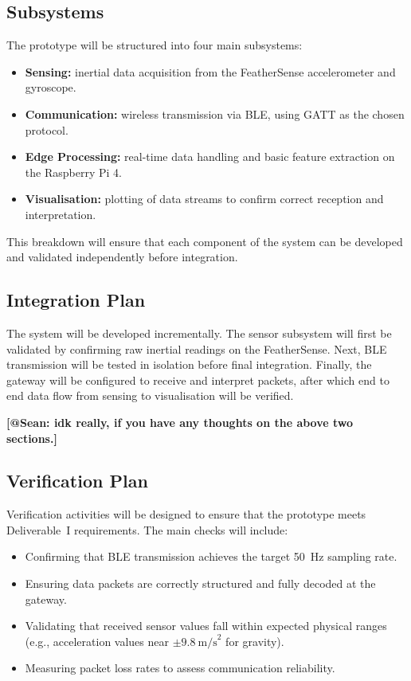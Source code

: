 \documentclass[conference]{lib/IEEEtran}
\begin{document}
\subsection{Subsystems}
The prototype will be structured into four main subsystems: 
\begin{itemize}
	\item \textbf{Sensing:} inertial data acquisition from the FeatherSense accelerometer and gyroscope. 
	\item \textbf{Communication:} wireless transmission via BLE, using GATT as the chosen protocol. 
	\item \textbf{Edge Processing:} real-time data handling and basic feature extraction on the Raspberry Pi 4. 
	\item \textbf{Visualisation:} plotting of data streams to confirm correct reception and interpretation. 
\end{itemize}
This breakdown will ensure that each component of the system can be developed and validated independently before integration. 

\subsection{Integration Plan}
The system will be developed incrementally. The sensor subsystem will first be validated by confirming raw inertial readings on the FeatherSense. Next, BLE transmission will be tested in isolation before final integration. Finally, the gateway will be configured to receive and interpret packets, after which end to end data flow from sensing to visualisation will be verified. 


\textbf{[@Sean: idk really, if you have any thoughts on the above two sections.]}

\subsection{Verification Plan}
Verification activities will be designed to ensure that the prototype meets Deliverable~I requirements. The main checks will include:
\begin{itemize}
	\item Confirming that BLE transmission achieves the target 50~Hz sampling rate. 
	\item Ensuring data packets are correctly structured and fully decoded at the gateway. 
	\item Validating that received sensor values fall within expected physical ranges (e.g., acceleration values near $\pm 9.8~\text{m/s}^2$ for gravity). 
	\item Measuring packet loss rates to assess communication reliability. 
\end{itemize}
\end{document}
